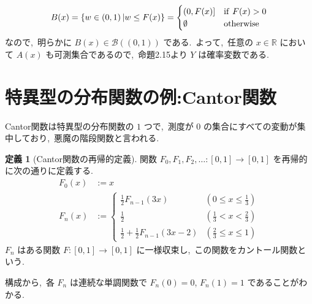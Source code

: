 \documentclass[a4j,11pt]{jarticle}
\theoremstyle{definition}
\newtheorem{definition}[theorem]{定義}
\begin{document}
\begin{equation}
  B(x) = \left\{ w  \in\left( 0,1\right) | w \leq F(x)\right\} = 
  \begin{cases}
    \left( 0, F(x)\right] & {\rm if } \ F(x) > 0 \\
    \emptyset & {\rm otherwise}
  \end{cases}
\end{equation}
なので,\ 明らかに
$B(x) \in \mathcal{B}((0,1))$
である.\ 
よって,\ 任意の
$x\in \mathbb{R}$
において
$A(x)$
も可測集合であるので,\ 命題2.15より
$Y$
は確率変数である.\ 


\section{特異型の分布関数の例:Cantor関数}
Cantor関数は特異型の分布関数の
$1$
つで,\ 測度が
$0$
の集合にすべての変動が集中しており,\ 悪魔の階段関数と言われる.\ 

\begin{definition}[Cantor関数の再帰的定義]
  関数
  $F_0,F_1,F_2,\ldots:[0,1]\to[0,1]$
  を再帰的に次の通りに定義する.\ 
  \begin{align}
    F_0(x)
    & := x\\
    F_n(x)
    & :=
    \begin{cases}
      \frac{1}{2}F_{n-1}(3x) & \left(0 \leq x \leq \frac{1}{3}\right) \\
      \frac{1}{2} & \left( \frac{1}{3} < x < \frac{2}{3}\right) \\
      \frac{1}{2} + \frac{1}{2}F_{n-1}(3x-2) & \left( \frac{2}{3} \leq x \leq 1\right)
    \end{cases}
  \end{align}
  $F_n$
  はある関数
  $F:[0,1]\to[0,1]$
  に一様収束し,\ この関数をカントール関数という.\ 
\end{definition}

構成から,\ 各
$F_n$
は連続な単調関数で
$F_n(0) = 0$,
$F_n(1) = 1$
であることがわかる.\ 
\end{document}

